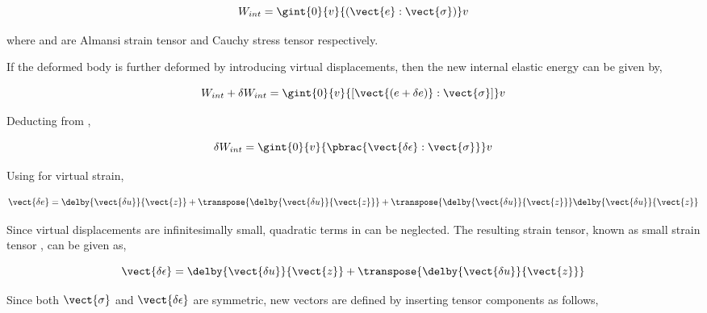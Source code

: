 \begin{equation}
  W_{int}=\gint{0}{v}{(\vect{e}:\vect{\sigma})}v
  \label{eqn:totalenergy}
\end{equation}

where  and \vect{\sigma} are Almansi strain tensor and Cauchy stress tensor respectively.  

If the deformed body is further deformed by introducing virtual displacements, then the new internal elastic energy can be given by,

\begin{equation}
  {W_{int}+\delta W_{int}}=\gint{0}{v}{[\vect{(e+\delta{e})}:\vect{\sigma}]}v
  \label{eqn:virtualtotalenergy}
\end{equation}

Deducting  from ,

\begin{equation}
  \delta W_{int}=\gint{0}{v}{\pbrac{\vect{\delta \epsilon} : \vect{\sigma}}}v
  \label{eqn:virtualenergy}
\end{equation}

Using  for virtual strain,

\begin{equation}
  \vect{\delta e}=\delby{\vect{\delta u}}{\vect{z}} + \transpose{\delby{\vect{\delta u}}{\vect{z}}} + 
                  \transpose{\delby{\vect{\delta u}}{\vect{z}}}\delby{\vect{\delta u}}{\vect{z}}
  \label{eqn:virtualalmansidisplacement}
\end{equation}

Since virtual displacements are infinitesimally small, quadratic terms in  can be neglected.
The resulting strain tensor, known as small strain tensor \vect{\epsilon}, can be given as,

\begin{equation}
  \vect{\delta \epsilon}=\delby{\vect{\delta u}}{\vect{z}} + \transpose{\delby{\vect{\delta u}}{\vect{z}}} 
  \label{eqn:virtualsmalldisplacement}
\end{equation}
 
Since both $\vect{\sigma}$ and $\vect{\delta \epsilon}$ are symmetric, new vectors are defined by inserting tensor components as follows,

